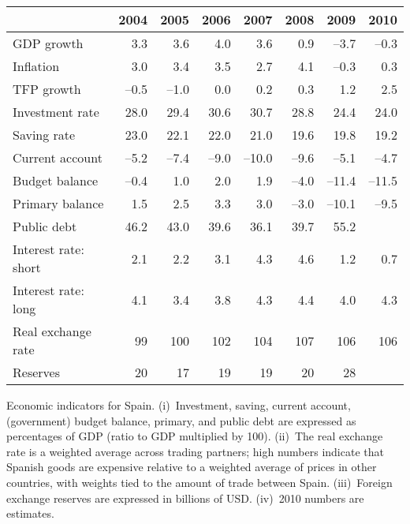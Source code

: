 \documentclass[letterpaper,12pt]{exam}
\begin{document}
\begin{questions} 

\begin{center}
\begin{tabular}{lrrrrrrr}
\toprule 
         &  2004  &  2005  &  2006   & 2007  & 2008 &  2009  &  2010 \\%
\midrule 
GDP growth  & 3.3 & 3.6 & 4.0 & 3.6 & 0.9 & --3.7 & --0.3 \\
Inflation   & 3.0 & 3.4 & 3.5 & 2.7 & 4.1 & --0.3 & 0.3  \\
TFP growth  & --0.5 & --1.0 & 0.0 & 0.2 & 0.3 & 1.2 & 2.5  \\ 
Investment rate & 28.0 & 29.4 & 30.6 & 30.7 & 28.8 & 24.4 & 24.0\\
Saving rate     & 23.0 & 22.1 & 22.0 & 21.0 & 19.6 & 19.8 & 19.2 \\
Current account & --5.2 & --7.4 & --9.0 & --10.0 & --9.6 & --5.1 
            & --4.7 \\
Budget balance  & --0.4 & 1.0 & 2.0 &  1.9 & --4.0 & --11.4 & --11.5 \\ 
Primary balance & 1.5 & 2.5 & 3.3 & 3.0 & --3.0 & --10.1 & --9.5 \\
Public debt      & 46.2 & 43.0 & 39.6 & 36.1 & 39.7 & 55.2 & \\
Interest rate:  short & 2.1 & 2.2 & 3.1 & 4.3 & 4.6 & 1.2 & 0.7 \\
Interest rate:  long  & 4.1 & 3.4 & 3.8 & 4.3 & 4.4 & 4.0 & 4.3 \\
Real exchange rate & 99 & 100 & 102 & 104 & 107 & 106 & 106 \\
Reserves            &  20 & 17 & 19 & 19 & 20 & 28 \\
\bottomrule 
\end{tabular}
\end{center}
Economic indicators for Spain.  
(i)~Investment, saving, current account, 
(government) budget balance, primary, 
and public debt are expressed as 
percentages of GDP (ratio to GDP multiplied by 100).  
(ii)~The real exchange rate is a weighted average across trading partners;
high numbers indicate that Spanish goods are expensive relative to 
a weighted average of prices in other countries, with weights
tied to the amount of trade between Spain.  
(iii)~Foreign exchange reserves are expressed in billions of USD.  
(iv)~2010 numbers are estimates.


\end{questions}
\end{document}
